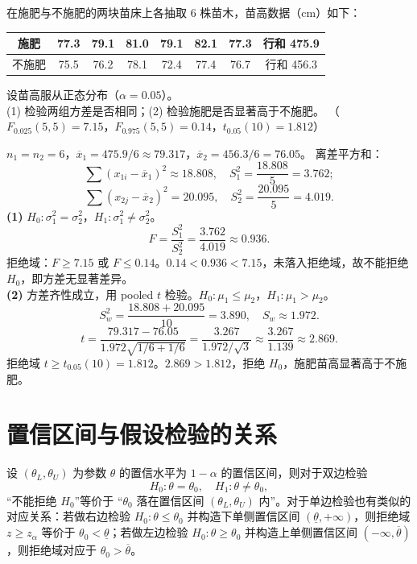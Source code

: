 ﻿\documentclass[lang=cn,11pt]{elegantbook}
\begin{document}
\begin{exercise} \label{ex:ht_f_pooled}
在施肥与不施肥的两块苗床上各抽取 6 株苗木，苗高数据（cm）如下：
\begin{center}
\begin{tabular}{ccccccc|c}
\toprule
施肥 & 77.3 & 79.1 & 81.0 & 79.1 & 82.1 & 77.3 & 行和 475.9 \\
\midrule
不施肥 & 75.5 & 76.2 & 78.1 & 72.4 & 77.4 & 76.7 & 行和 456.3 \\
\bottomrule
\end{tabular}
\end{center}
设苗高服从正态分布（\(\alpha=0.05\)）。\\
(1) 检验两组方差是否相同；(2) 检验施肥是否显著高于不施肥。
（\(F_{0.025}(5,5)=7.15\)，\(F_{0.975}(5,5)=0.14\)，\(t_{0.05}(10)=1.812\)）
\end{exercise}
\begin{solution}
\(n_1=n_2=6\)，\(\overline{x}_1=475.9/6\approx79.317\)，\(\overline{x}_2=456.3/6=76.05\)。
离差平方和：
\[
\sum(x_{1i}-\overline{x}_1)^2\approx18.808,\quad S_1^2=\frac{18.808}{5}=3.762;
\]
\[
\sum(x_{2j}-\overline{x}_2)^2=20.095,\quad S_2^2=\frac{20.095}{5}=4.019.
\]
\textbf{(1)} \(H_0\colon\sigma_1^2=\sigma_2^2\)，\(H_1\colon\sigma_1^2\neq\sigma_2^2\)。
\[
F=\frac{S_1^2}{S_2^2}=\frac{3.762}{4.019}\approx0.936.
\]
拒绝域：\(F\geq7.15\) 或 \(F\leq0.14\)。\(0.14<0.936<7.15\)，未落入拒绝域，故不能拒绝 \(H_0\)，即方差无显著差异。\\
\textbf{(2)} 方差齐性成立，用 pooled \(t\) 检验。\(H_0\colon\mu_1\leq\mu_2\)，\(H_1\colon\mu_1>\mu_2\)。
\[
S_w^2=\frac{18.808+20.095}{10}=3.890,\quad S_w\approx1.972.
\]
\[
t=\frac{79.317-76.05}{1.972\sqrt{1/6+1/6}}=\frac{3.267}{1.972/\sqrt{3}}\approx\frac{3.267}{1.139}\approx2.869.
\]
拒绝域 \(t\geq t_{0.05}(10)=1.812\)。\(2.869>1.812\)，拒绝 \(H_0\)，施肥苗高显著高于不施肥。
\end{solution}


\section{置信区间与假设检验的关系} \label{sec:ht-ci}

\begin{property}[置信区间与假设检验的等价性]\label{prop:ci-test-equiv}
设 \((\theta_L, \theta_U)\) 为参数 \(\theta\) 的置信水平为 \(1-\alpha\) 的置信区间，则对于双边检验
\[
H_0\colon \theta=\theta_0,\quad H_1\colon \theta\neq\theta_0,
\]
“不能拒绝 \(H_0\)”等价于 “\(\theta_0\) 落在置信区间 \((\theta_L, \theta_U)\) 内”。对于单边检验也有类似的对应关系：若做右边检验 \(H_0\colon \theta\leq\theta_0\) 并构造下单侧置信区间 \((\underline{\theta},+\infty)\)，则拒绝域 \(z\geq z_\alpha\) 等价于 \(\theta_0<\underline{\theta}\)；若做左边检验 \(H_0\colon \theta\geq\theta_0\) 并构造上单侧置信区间 \((-\infty,\overline{\theta})\)，则拒绝域对应于 \(\theta_0>\overline{\theta}\)。
\end{property}
\end{document}
